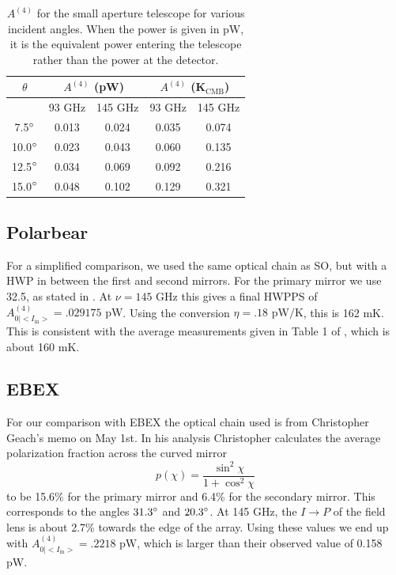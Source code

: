\documentclass{article}
\theoremstyle{remark}
\newcommand{\tab}{\hspace*{2em}}
\renewcommand{\t}[1]{\text{#1}}
\newcommand{\AI}{A^{(4)}_{0|<I_{\t{in}}>}}
\newcommand{\A}[1]{A^{(#1)}}
\newcommand{\ip}{$I\rightarrow P$ }
\begin{document}
\begin{table}[h]
\centering

\begin{tabular}{|c|c|c|c|c|}
\hline
$\theta$ & \multicolumn{2}{|c|}{$\A4 $ (pW)}&  \multicolumn{2}{|c|}{$\A4 $ (K$_\text{CMB}$)} \\
\hline
      & 93 GHz   & 145 GHz  & 93 GHz & 145 GHz         \\
\hline
7.5$\degree$ & 0.013 & 0.024 & 0.035 & 0.074 \\
10.0$\degree$ & 0.023 & 0.043 & 0.060 & 0.135 \\
12.5$\degree$ & 0.034 & 0.069 & 0.092 & 0.216 \\
15.0$\degree$ & 0.048 & 0.102 & 0.129 & 0.321 \\
\hline
\end{tabular}
\caption{ $\A4$ for the small aperture telescope for various incident angles. 
When the power is given in pW, it is the equivalent power entering the telescope rather than the power at the detector.
}
\label{table:smallAp_A4}
\end{table}



\subsection{Polarbear}
\tab For a simplified comparison, we used the same optical chain as SO, but with a HWP in between the first and second mirrors.
For the primary mirror we use 32.5\degree, as stated in \cite{takakura_performance_2017}. At $\nu = 145 \t{ GHz}$ this gives a final 
HWPPS of $\AI = .029175 \t{ pW}$. 
Using the conversion $\eta = .18 \t{ pW/K}$, this is 162 mK.
This is consistent with the average measurements given in Table 1 of \cite{takakura_performance_2017}, which is about 160 mK.


\subsection{EBEX}


\tab For our comparison with EBEX the optical chain used is from Christopher Geach's memo on May 1st.
In his analysis Christopher calculates the average polarization fraction across the curved mirror
\[p(\chi) = \frac{\sin^2 \chi}{1 + \cos^2 \chi}\]
to be 15.6\% for the primary mirror and 6.4\% for the secondary mirror. 
This corresponds to the angles $31.3\degree$ and $20.3 \degree$.
At 145 GHz, the \ip of the field lens is about 2.7\% towards the edge of the array.
Using these values we end up with $\AI = .2218 \t{ pW}$, which is larger than their observed value of 0.158 pW.
\end{document}
